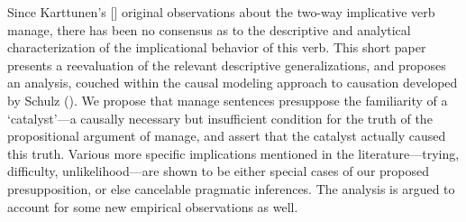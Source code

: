 Since Karttunen's {[\cite*{karttunen1971-language}]} original observations about the two-way implicative verb manage, there has been no consensus as to the descriptive and analytical characterization of the implicational behavior of this verb. This short paper presents a reevaluation of the relevant descriptive generalizations, and proposes an analysis, couched within the causal modeling approach to causation developed by Schulz (\cite*{schulz2010-synthese}). We propose that manage sentences presuppose the familiarity of a ‘catalyst’—a causally necessary but insufficient condition for the truth of the propositional argument of manage, and assert that the catalyst actually caused this truth. Various more specific implications mentioned in the literature—trying, difficulty, unlikelihood—are shown to be either special cases of our proposed presupposition, or else cancelable pragmatic inferences. The analysis is argued to account for some new empirical observations as well.
\endinput
